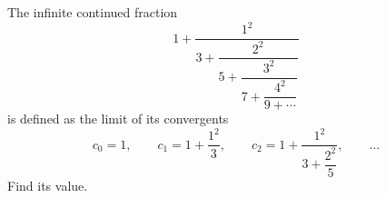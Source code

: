 The infinite continued fraction
\[1+\dfrac{1^2}{3+\dfrac{2^2}{5+\dfrac{3^2}{7+\dfrac{4^2}{9+\cdots}}}}\]
is defined as the limit of its convergents
\[c_0=1,\qquad c_1=1+\dfrac{1^2}{3},\qquad c_2=1+\dfrac{1^2}{3+\dfrac{2^2}{5}},\qquad\dots\]
Find its value.
